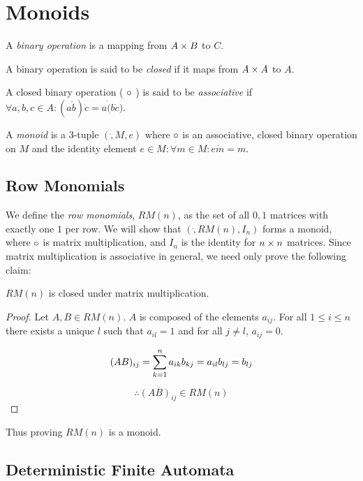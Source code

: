 \chapter{Monoids}

A \emph{binary operation} is a mapping from $A \cross B$ to $ C $.

A binary operation is said to be \emph{closed} if it maps from $A
\cross A$ to $A$.

A closed binary operation ( $ \dot $ ) is said to be
\emph{associative} if $ \forall a,b,c \in A: ( a \dot b ) \dot c = a
\dot ( b \dot c )$.

A \emph{monoid} is a 3-tuple $(\dot, M, e)$ where $\dot$ is an
associative, closed binary operation on $M$ and the identity element $
e \in M: \forall m \in M: e \dot m = m $.

\section{Row Monomials}

We define the \emph{row monomials}, $RM(n)$, as the set of all $0,1$
matrices with exactly one $1$ per row.  We will show that
$(\dot,RM(n),I_n)$ forms a monoid, where $\dot$ is matrix
multiplication, and $I_n$ is the identity for $n \cross n$ matrices.
Since matrix multiplication is associative in general, we need only
prove the following claim:

\begin{claim}

  $RM(n)$ is closed under matrix multiplication.

\end{claim}

\begin{proof}

  Let $A,B \in RM(n)$.  $A$ is composed of the elements $a_{ij}$.  For
  all $1 \leq i \leq n$ there exists a unique $l$ such that $a_{il} =
  1$ and for all $j \neq l$, $a_{ij} = 0$.

  \[
  (AB)_{ij} = \summ{k=1}{n} a_{ik}b_{kj} = a_{il}b_{lj} = b_{lj}
  \]

  \[
  \therefore (AB)_{ij} \in RM(n)
  \]
  
\end{proof}

Thus proving $RM(n)$ is a monoid.

\section{Deterministic Finite Automata}

